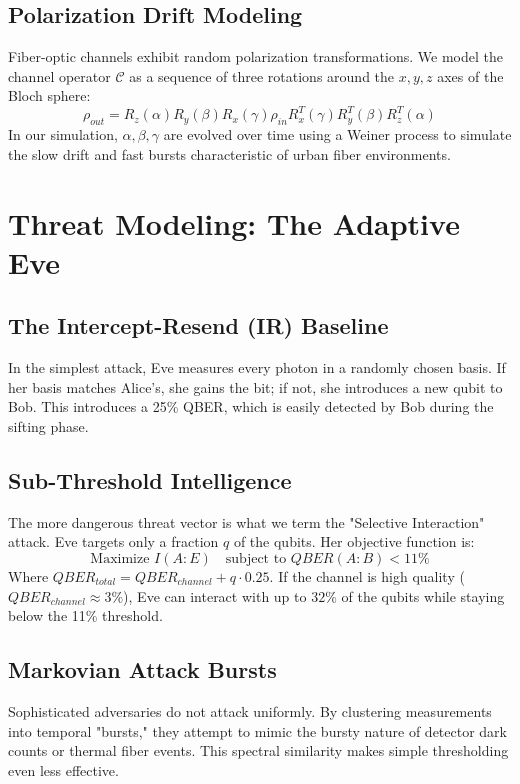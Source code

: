 \documentclass[journal,onecolumn,12pt,draftclsnofoot]{IEEEtran}
\begin{document}
\subsection{Polarization Drift Modeling}
Fiber-optic channels exhibit random polarization transformations. We model the channel operator $\mathcal{C}$ as a sequence of three rotations around the $x, y, z$ axes of the Bloch sphere:
\begin{equation}
    \rho_{out} = R_z(\alpha) R_y(\beta) R_x(\gamma) \rho_{in} R_x^T(\gamma) R_y^T(\beta) R_z^T(\alpha)
\end{equation}
In our simulation, $\alpha, \beta, \gamma$ are evolved over time using a Weiner process to simulate the slow drift and fast bursts characteristic of urban fiber environments.

\newpage

\section{Threat Modeling: The Adaptive Eve}

\subsection{The Intercept-Resend (IR) Baseline}
In the simplest attack, Eve measures every photon in a randomly chosen basis. If her basis matches Alice's, she gains the bit; if not, she introduces a new qubit to Bob. This introduces a 25\% QBER, which is easily detected by Bob during the sifting phase.

\subsection{Sub-Threshold Intelligence}
The more dangerous threat vector is what we term the "Selective Interaction" attack. Eve targets only a fraction $q$ of the qubits. Her objective function is:
\begin{equation}
    \text{Maximize } I(A:E) \quad \text{subject to } QBER(A:B) < 11\%
\end{equation}
Where $QBER_{total} = QBER_{channel} + q \cdot 0.25$. If the channel is high quality ($QBER_{channel} \approx 3\%$), Eve can interact with up to $32\%$ of the qubits while staying below the 11\% threshold.

\subsection{Markovian Attack Bursts}
Sophisticated adversaries do not attack uniformly. By clustering measurements into temporal "bursts," they attempt to mimic the bursty nature of detector dark counts or thermal fiber events. This spectral similarity makes simple thresholding even less effective.
\end{document}
